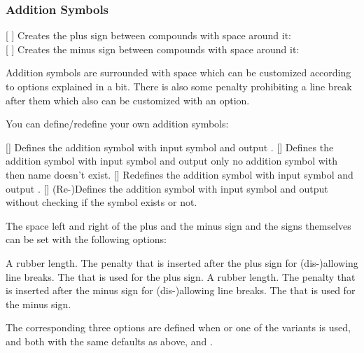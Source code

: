 \documentclass[load-preamble+]{cnltx-doc}
\begin{document}
\subsubsection{Addition Symbols}\label{sec:addition-symbols}
\begin{commands}
  [\Marg{ + } \ch{ + }]
    Creates the plus sign between compounds with space around it:\\
     
  [\Marg{ - } \ch{ - }]
    Creates the minus sign between compounds with space
    around it:\\
     
\end{commands}
Addition symbols are surrounded with space which can be customized according
to options explained in a bit.  There is also some penalty prohibiting a line
break after them which also can be customized with an option.

You can define/redefine your own addition symbols:
\begin{commands}
  []
    Defines the addition symbol  with input
    symbol  and output .
  []
    Defines the addition symbol  with input
    symbol  and output  only no addition symbol with
    then name  doesn't exist.
  []
    Redefines the addition symbol  with input
    symbol  and output .
  []
    (Re-)Defines the addition symbol  with input
    symbol  and output  without checking if the
    symbol exists or not.
\end{commands}

The space left and right of the plus and the minus sign and the signs
themselves can be set with the following options:
\begin{options}
    A rubber length.
    The penalty that is inserted after the plus sign for
    (dis-)allowing line breaks.
  \Default{+}
    The  that is used for the plus sign.
    A rubber length.
    The penalty that is inserted after the minus sign for
    (dis-)allowing line breaks.
  \Default{\$-\$}
    The  that is used for the minus sign.
\end{options}
The corresponding three options are defined when 
or one of the variants is used,  and
 both with the same defaults as above, and
.
\end{document}
